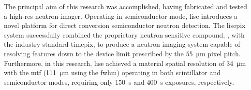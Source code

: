 \documentclass[../../../main.tex]{subfiles}%
\begin{document}
%
    \Xsection%
    The principal aim of this research was accomplished, having fabricated and tested a \gls{high-res} neutron imager.
    Operating in semiconductor mode, \gls{lise} introduces a novel platform for direct conversion semiconductor neutron detection.
    The \gls{lisepix} system successfully combined the proprietary neutron sensitive compound, , with the industry standard \gls{timepix}, to produce a neutron imaging system capable of resolving features down to the device limit prescribed by the \SI{55}{\micro\meter} pixel pitch.
    Furthermore, in this research, \gls{lise} achieved a material spatial resolution of \SI{34}{\micro\meter} with the \gls{mtf} (\SI{111}{\micro\meter} using the \gls{fwhm}) operating in both scintillator and semiconductor modes, requiring only \SI{150}{\second} and \SI{400}{\second} exposures, respectively.
\end{document}
